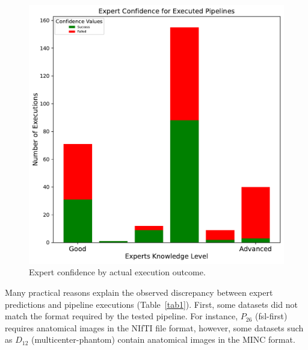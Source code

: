 \begin{figure}
  \includegraphics[width=\columnwidth]{figures/Confidence Stacked Bar Experts.pdf}
  \caption{Expert confidence by actual execution outcome.}
  \label{fig:confidence_swarm}
\end{figure}




Many practical reasons explain the observed discrepancy between expert
predictions and pipeline executions (Table~\ref{tab1}). First, some
datasets did not match the format required by the tested pipeline. For
instance, $P_{26}$ (fsl-first) requires anatomical images in the NIfTI file
format, however, some datasets such as $D_{12}$ (multicenter-phantom)
contain anatomical images in the MINC format.

